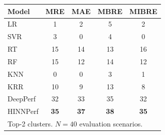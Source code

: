 \begin{tabular}{lcccc}
\toprule
Model & MRE & MAE & MBRE & MIBRE \\
\midrule
LR & 1 & 2 & 5 & 2 \\
SVR & 3 & 0 & 4 & 0 \\
RT & 15 & 14 & 13 & 16 \\
RF & 15 & 12 & 14 & 12 \\
KNN & 0 & 0 & 3 & 1 \\
KRR & 10 & 9 & 13 & 8 \\
DeepPerf & 32 & 33 & 35 & 32 \\
HINNPerf & \textbf{35} & \textbf{37} & \textbf{38} & \textbf{35} \\
\midrule
\multicolumn{5}{l}{\footnotesize Top-2 clusters. $N=40$ evaluation scenarios.} \\
\bottomrule
\end{tabular}
